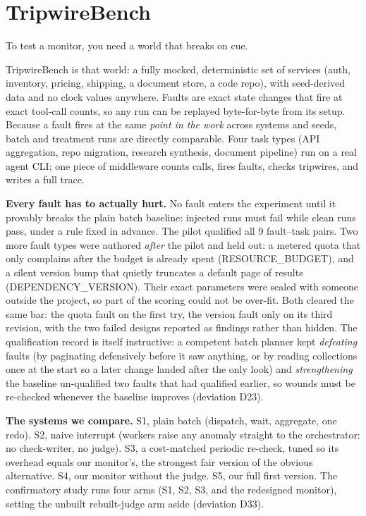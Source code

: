 \documentclass[acmsmall,screen]{acmart}
\begin{document}
\section{TripwireBench}
To test a monitor, you need a world that breaks on cue.

TripwireBench is that world: a fully mocked, deterministic set of services
(auth, inventory, pricing, shipping, a document store, a code repo), with
seed-derived data and no clock values anywhere. Faults are exact state changes
that fire at exact tool-call counts, so any run can be replayed byte-for-byte
from its setup. Because a fault fires at the same \emph{point in the work}
across systems and seeds, batch and treatment runs are directly comparable.
Four task types (API aggregation, repo migration, research synthesis, document
pipeline) run on a real agent CLI; one piece of middleware counts calls, fires
faults, checks tripwires, and writes a full trace.

\textbf{Every fault has to actually hurt.} No fault enters the experiment until
it provably breaks the plain batch baseline: injected runs must fail while clean
runs pass, under a rule fixed in advance. The pilot qualified all 9 fault--task
pairs. Two more fault types were authored \emph{after} the pilot and held out: a
metered quota that only complains after the budget is already spent
(RESOURCE\_BUDGET), and a silent version bump that quietly truncates a default
page of results (DEPENDENCY\_VERSION). Their exact parameters were sealed with
someone outside the project, so part of the scoring could not be over-fit. Both
cleared the same bar: the quota fault on the first try, the version fault only
on its third revision, with the two failed designs reported as findings rather
than hidden. The qualification record is itself instructive: a competent batch
planner kept \emph{defeating} faults (by paginating defensively before it saw
anything, or by reading collections once at the start so a later change landed
after the only look) and \emph{strengthening} the baseline un-qualified two
faults that had qualified earlier, so wounds must be re-checked whenever the
baseline improves (deviation D23).

\textbf{The systems we compare.} S1, plain batch (dispatch, wait, aggregate,
one redo). S2, naive interrupt (workers raise any anomaly straight to the
orchestrator: no check-writer, no judge). S3, a cost-matched periodic
re-check, tuned so its overhead equals our monitor's, the strongest fair
version of the obvious alternative. S4, our monitor without the judge. S5, our
full first version. The confirmatory study runs four arms (S1, S2, S3, and the
redesigned monitor), setting the unbuilt rebuilt-judge arm aside (deviation
D33).
\end{document}
